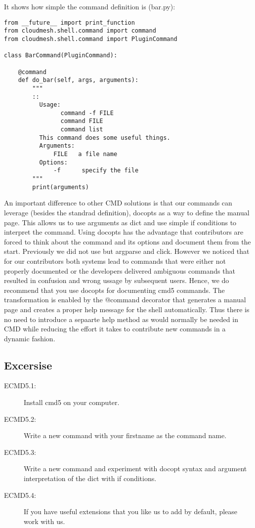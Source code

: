 It shows how simple the command definition is (bar.py):

\begin{verbatim}
from __future__ import print_function
from cloudmesh.shell.command import command
from cloudmesh.shell.command import PluginCommand

class BarCommand(PluginCommand):

    @command
    def do_bar(self, args, arguments):
        """
        ::
          Usage:
                command -f FILE
                command FILE
                command list
          This command does some useful things.
          Arguments:
              FILE   a file name
          Options:
              -f      specify the file
        """
        print(arguments)
\end{verbatim}

An important difference to other CMD solutions is that our commands can
leverage (besides the standrad definition), docopts as a way to define
the manual page. This allows us to use arguments as dict and use simple
if conditions to interpret the command. Using docopts has the advantage
that contributors are forced to think about the command and its options
and document them from the start. Previously we did not use but argparse
and click. However we noticed that for our contributors both systems
lead to commands that were either not properly documented or the
developers delivered ambiguous commands that resulted in confusion and
wrong ussage by subsequent users. Hence, we do recommend that you use
docopts for documenting cmd5 commands. The transformation is enabled by
the @command decorator that generates a manual page and creates a proper
help message for the shell automatically. Thus there is no need to
introduce a sepaarte help method as would normally be needed in CMD
while reducing the effort it takes to contribute new commands in a
dynamic fashion.

\subsection{Excersise}\label{excersise}

\begin{description}
\item[ECMD5.1:]
Install cmd5 on your computer.
\item[ECMD5.2:]
Write a new command with your firstname as the command name.
\item[ECMD5.3:]
Write a new command and experiment with docopt syntax and argument
interpretation of the dict with if conditions.
\item[ECMD5.4:]
If you have useful extensions that you like us to add by default, please
work with us.
\end{description}
